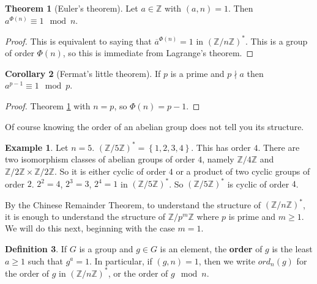 \documentclass{article}
\newcommand{\Z}{\mathbb{Z}}
\newcommand{\rb}[1]{\left( #1 \right)}
\newcommand{\cb}[1]{\left\{ #1 \right\}}
\theoremstyle{definition}\newtheorem{definition}{Definition}
\theoremstyle{definition}\newtheorem*{remark}{Remark}
\theoremstyle{definition}\newtheorem*{example}{Example}
\theoremstyle{definition}\newtheorem*{note}{Note}
\newtheorem{theorem}[definition]{Theorem}
\newtheorem{corollary}[definition]{Corollary}
\begin{document}
\begin{theorem}[Euler's theorem]
\label{thm:16}
Let $ a \in \Z $ with $ \rb{a, n} = 1 $. Then $ a^{\Phi\rb{n}} \equiv 1 \mod n $.
\end{theorem}

\begin{proof}
This is equivalent to saying that $ \overline{a}^{\Phi\rb{n}} = 1 $ in $ \rb{\Z / n\Z}^* $. This is a group of order $ \Phi\rb{n} $, so this is immediate from Lagrange's theorem.
\end{proof}

\begin{corollary}[Fermat's little theorem]
If $ p $ is a prime and $ p \nmid a $ then $ a^{p - 1} \equiv 1 \mod p $.
\end{corollary}

\begin{proof}
Theorem \ref{thm:16} with $ n = p $, so $ \Phi\rb{n} = p - 1 $.
\end{proof}

Of course knowing the order of an abelian group does not tell you its structure.

\begin{example}
Let $ n = 5 $. $ \rb{\Z / 5\Z}^* = \cb{1, 2, 3, 4} $. This has order $ 4 $. There are two isomorphism classes of abelian groups of order $ 4 $, namely $ \Z / 4\Z $ and $ \Z / 2\Z \times \Z / 2\Z $. So it is either cyclic of order $ 4 $ or a product of two cyclic groups of order $ 2 $. $ 2^2 = 4 $, $ 2^3 = 3 $, $ 2^4 = 1 $ in $ \rb{\Z / 5\Z}^* $. So $ \rb{\Z / 5\Z}^* $ is cyclic of order $ 4 $.
\end{example}

By the Chinese Remainder Theorem, to understand the structure of $ \rb{\Z / n\Z}^* $, it is enough to understand the structure of $ \Z / p^m\Z $ where $ p $ is prime and $ m \ge 1 $. We will do this next, beginning with the case $ m = 1 $.


\begin{definition}
If $ G $ is a group and $ g \in G $ is an element, the \textbf{order} of $ g $ is the least $ a \ge 1 $ such that $ g^a = 1 $. In particular, if $ \rb{g, n} = 1 $, then we write $ ord_n\rb{g} $ for the order of $ g $ in $ \rb{\Z / n\Z}^* $, or the order of $ g \mod n $.
\end{definition}
\end{document}

